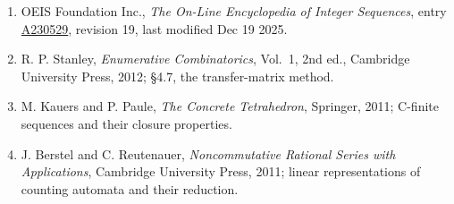 \documentclass[11pt]{article}
\theoremstyle{definition}
\begin{document}
\begin{enumerate}

\item OEIS Foundation Inc., \emph{The On-Line Encyclopedia of Integer Sequences}, entry \href{https://oeis.org/A230529}{A230529}, revision 19, last modified Dec 19 2025.

\item R. P. Stanley, \emph{Enumerative Combinatorics}, Vol.~1, 2nd ed., Cambridge University Press, 2012; \S4.7, the transfer-matrix method.

\item M. Kauers and P. Paule, \emph{The Concrete Tetrahedron}, Springer, 2011; C-finite sequences and their closure properties.

\item J. Berstel and C. Reutenauer, \emph{Noncommutative Rational Series with Applications}, Cambridge University Press, 2011; linear representations of counting automata and their reduction.

\end{enumerate}
\end{document}
